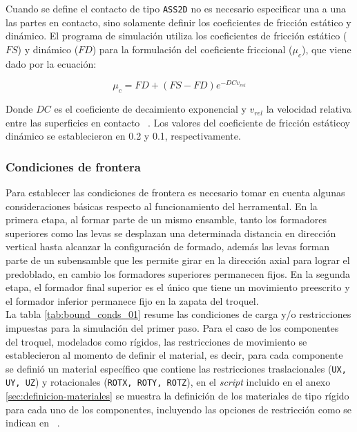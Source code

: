 Cuando se define el contacto de tipo \texttt{ASS2D} no es necesario especificar una a una las partes 
en contacto, sino solamente definir los coeficientes de fricción estático y dinámico. El programa de 
simulación utiliza los coeficientes de fricción estático ($FS$) y dinámico ($FD$) para la 
formulación del coeficiente friccional ($\mu_c$), que viene dado por la ecuación: ~\cite{lsdyna-manual}

\begin{equation}
\mu_c = FD + (FS - FD) e^{-DCv_{rel}}
\label{eq:frictional_coeff}
\end{equation}

Donde $DC$ es el coeficiente de decaimiento exponencial y $v_{rel}$ la velocidad relativa
entre las superficies en contacto ~\cite{lsdyna-ansys-manual}. Los valores del coeficiente de 
fricción estáticoy dinámico se establecieron en 0.2 y 0.1, respectivamente. ~\cite{carvill1993} \\

\subsubsection{Condiciones de frontera}\label{sec:condiciones-fronteras}

Para establecer las condiciones de frontera es necesario tomar en cuenta algunas  consideraciones 
básicas respecto al funcionamiento del herramental. En la primera etapa, al formar parte de un 
mismo ensamble, tanto los formadores superiores como las levas se desplazan una determinada distancia 
en dirección vertical hasta alcanzar la configuración de formado, además las levas forman 
parte de un subensamble que les permite girar en la dirección axial para lograr el predoblado, en 
cambio los formadores superiores permanecen fijos. En la segunda etapa, el formador final superior 
es el único que tiene un movimiento preescrito y el formador inferior permanece fijo en la zapata del troquel. \\

La tabla \ref{tab:bound_conds_01} resume las condiciones de carga y/o restricciones impuestas 
para la simulación del primer paso. Para el caso de los componentes del troquel, modelados como 
rígidos, las restricciones de movimiento se establecieron al momento de definir el material, 
es decir, para cada componente se definió un material específico que contiene las restricciones 
traslacionales ({\tt UX, UY, UZ}) y rotacionales ({\tt ROTX, ROTY, ROTZ}), en el \textit{script} 
incluido en el anexo \ref{sec:definicion-materiales} se muestra la definición de los materiales 
de tipo rígido para cada uno de los componentes, incluyendo las opciones de restricción como 
se indican en ~\cite{lsdyna-ansys-manual}. \\

